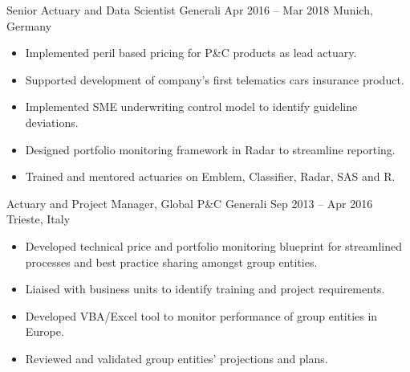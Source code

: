 \documentclass[a4paper,]{fortysecondscv}
\begin{document}
\begin{cvtable}
{\begin{itemize}[nosep, leftmargin=12pt , label={-}]
        \end{itemize}
    }
    \vspace{\topsep}
    \cvitemoneblock
    {Senior Actuary and Data Scientist}
    {Generali}
    {Apr 2016 -- Mar 2018}
    {Munich, Germany}
    {
        \begin{itemize}[nosep, leftmargin=12pt , label={-}] %
            \item Implemented peril based pricing for P\&C products as lead actuary.
            \item Supported development of company's first telematics cars insurance product.
            \item Implemented SME underwriting control model to identify guideline deviations.
            \item Designed portfolio monitoring framework in Radar to streamline reporting.
            \item Trained and mentored actuaries on Emblem, Classifier, Radar, SAS and R.
        \end{itemize}
    }
    \vspace{\topsep}
    \cvitemoneblock
    {Actuary and Project Manager, Global P\&C}
    {Generali}
    {Sep 2013 -- Apr 2016}
    {Trieste, Italy}
    {
        \begin{itemize}[nosep, leftmargin=12pt , label={-}] %
            \item Developed technical price and portfolio monitoring blueprint for streamlined processes and best practice sharing amongst group entities.
            \item Liaised with business units to identify training and project requirements.
            \item Developed VBA\//Excel tool to monitor performance of group entities in Europe.
            \item Reviewed and validated group entities' projections and plans.

\end{itemize}}
\end{cvtable}
\end{document}
